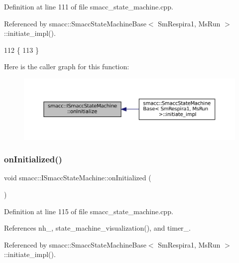 Definition at line 111 of file smacc\+\_\+state\+\_\+machine.\+cpp.



Referenced by smacc\+::\+Smacc\+State\+Machine\+Base$<$ Sm\+Respira1, Ms\+Run $>$\+::initiate\+\_\+impl().


\begin{DoxyCode}
112 \{
113 \}
\end{DoxyCode}
Here is the caller graph for this function\+:
\nopagebreak
\begin{figure}[H]
\begin{center}
\leavevmode
\includegraphics[width=350pt]{classsmacc_1_1ISmaccStateMachine_ac2982c6c8283663e5e1e8a7c82f511ec_icgraph}
\end{center}
\end{figure}
\mbox{\label{classsmacc_1_1ISmaccStateMachine_a95e7f71d0d88fffd0afebb1f9ccdade5}} 
\subsubsection{\texorpdfstring{on\+Initialized()}{onInitialized()}}
{\footnotesize\ttfamily void smacc\+::\+I\+Smacc\+State\+Machine\+::on\+Initialized (\begin{DoxyParamCaption}{ }\end{DoxyParamCaption})\hspace{0.3cm}{\ttfamily [protected]}}



Definition at line 115 of file smacc\+\_\+state\+\_\+machine.\+cpp.



References nh\+\_\+, state\+\_\+machine\+\_\+visualization(), and timer\+\_\+.



Referenced by smacc\+::\+Smacc\+State\+Machine\+Base$<$ Sm\+Respira1, Ms\+Run $>$\+::initiate\+\_\+impl().


